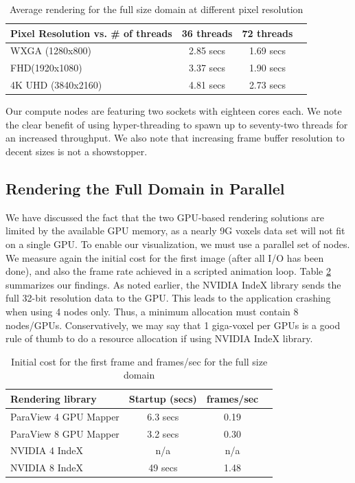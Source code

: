 \documentclass[5p,times]{elsarticle}
\begin{document}
\begin{table}[htb]
  \centering
  \caption{
    Average rendering for the full size domain at different pixel resolution
  }
  \label{tab:osprayThreads}

  \begin{tabular}{lccc}
    \hline
    Pixel Resolution vs. \# of threads  & 36 threads & 72 threads\\
    \hline
    WXGA (1280x800) & 2.85 secs &  1.69 secs \\
    FHD(1920x1080) & 3.37 secs &  1.90 secs \\
    4K UHD (3840x2160) & 4.81 secs &  2.73 secs \\
    \hline

  \end{tabular}
\end{table}

Our compute nodes are featuring two sockets with eighteen cores each. We note the clear benefit of using hyper-threading to spawn up to seventy-two threads for an increased throughput. We also note that increasing frame buffer resolution to decent sizes is not a showstopper. 

\subsection{Rendering the Full Domain in Parallel}

We have discussed the fact that the two GPU-based rendering solutions
are limited by the available GPU memory, as a nearly 9G voxels data set will
not fit on a single GPU. To enable our visualization, we must use a parallel 
set of nodes. We measure again the initial cost for the first image
(after all I/O has been done), and also the frame rate achieved in a scripted
animation loop. Table \ref{tab:parallelgpu-tab} summarizes our findings. As noted earlier,
the NVIDIA IndeX library sends the full 32-bit resolution data to the GPU. This
leads to the application crashing when using 4 nodes only. Thus, a minimum
allocation must contain 8 nodes/GPUs. Conservatively, we may say that 1 giga-voxel
per GPUs is a good rule of thumb to do a resource allocation if using NVIDIA IndeX library.

\begin{table}[htb]
  \centering
  \caption{
    Initial cost for the first frame and frames/sec for the full size domain
  }
  \label{tab:parallelgpu-tab}

  \begin{tabular}{lccc}
    \hline
    Rendering library & Startup (secs) & frames/sec\\
    \hline
    ParaView 4 GPU Mapper & 6.3 secs &  0.19 \\
    ParaView 8 GPU Mapper & 3.2 secs &  0.30 \\
    NVIDIA 4 IndeX & n/a &  n/a\\
    NVIDIA 8 IndeX & 49 secs &  1.48\\
    \hline

  \end{tabular}
\end{table}
\end{document}
